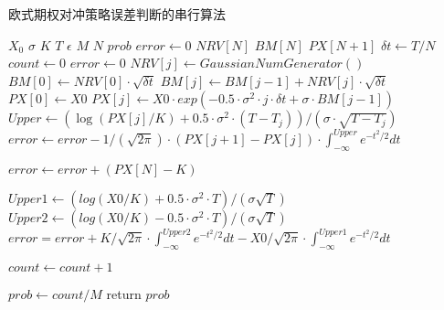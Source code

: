 \begin{algorithm}
  \caption{欧式期权对冲策略误差判断的串行算法}
  \label{alg:bserror}
	\begin{algorithmic}[1]
	 \Require $X_0$ 
	 \Require $\sigma$ 
	 \Require $K$ 
	 \Require $T$ 
	 \Require $\epsilon$ 
         \Require $M$ 
         \Require $N$ 
         \Ensure $prob$
         \State $error \gets 0$ 
         \State $NRV[N]$ 
         \State $BM[N]$ 
         \State $PX[N+1]$ 
	 \State $\delta t \gets T/N$ 
	 \State $count \gets 0$ 
	   
          \State $error \gets 0$ 
	     $NRV[j] \gets GaussianNumGenerator()$
	  \EndFor
	  \State $BM[0] \gets NRV[0] \cdot \sqrt{\delta t}$ 
	     $BM[j] \gets BM[j-1] + NRV[j]\cdot \sqrt{\delta t}$ 
	  \EndFor
	  \State $PX[0] \gets X0$
	  \State $PX[j]\gets X0 \cdot exp(-0.5\cdot \sigma^2 \cdot j \cdot \delta t + \sigma \cdot BM[j-1])$
	  \EndFor
	  \State $Upper \gets (\log(PX[j]/K) + 0.5\cdot \sigma^2 \cdot (T- T_j))/ (\sigma \cdot \sqrt{T-T_j})$ 
	  \State $error \gets error - 1/(\sqrt{2\pi}) \cdot (PX[j+1]-PX[j])\cdot \int_{-\infty}^{Upper}e^{-t^2/2}dt $
	  \EndFor

	  \State $error \gets error + (PX[N]-K)$
	  \EndIf

	  \State $Upper1 \gets (log(X0/K) + 0.5\cdot \sigma^2 \cdot T)/(\sigma \sqrt{T})$
	  \State $Upper2 \gets (log(X0/K) - 0.5\cdot \sigma^2 \cdot T)/(\sigma \sqrt{T})$
	  \State $error = error + K/\sqrt{2\pi} \cdot \int_{-\infty}^{Upper2}e^{-t^2/2}dt -X0/\sqrt{2\pi}\cdot \int_{-\infty}^{Upper1}e^{-t^2/2}dt$
	  
	  \State $count \gets count + 1$ 
	  \EndIf
	  \EndFor

	  \State $prob \gets count/M$
	  \State return $prob$
	 \EndProcedure
  \end{algorithmic}
\end{algorithm}






